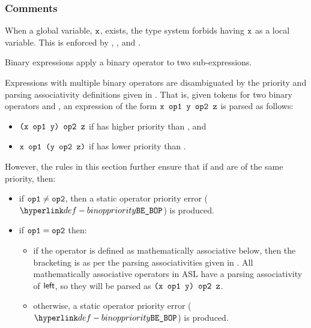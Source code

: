 
\subsubsection{Comments}
When a global variable, $\texttt{x}$, exists, the type system
forbids having $\texttt{x}$ as a local variable.
This is enforced by ,
, and .

\hypertarget{def-binopexpressionterm}{}
Binary expressions apply a binary operator to two sub-expressions.

Expressions with multiple binary operators are disambiguated by the priority
and parsing associativity definitions given in
. That is, given tokens for two binary operators
\opone{} and \optwo{}, an expression of the form
$\texttt{x \texttt{op1}{} y \texttt{op2}{} z}$ is parsed as follows:
\begin{itemize}
  \item $\texttt{(x \texttt{op1}{} y) \texttt{op2}{} z}$ if \opone{} has higher priority than
        \optwo{}, and
  \item $\texttt{x \texttt{op1}{} (y \texttt{op2}{} z)}$ if \opone{} has lower priority than
        \optwo{}.
\end{itemize}

However, the rules in this section further ensure that if \opone{} and \optwo{}
are of the same priority, then:
\begin{itemize}
  \item if $\texttt{op1}{} \neq \texttt{op2}{}$, then a static operator priority error
        ($\BinopPriority$) is produced.
  \item if $\texttt{op1}{} = \texttt{op2}{}$ then:
    \begin{itemize}
      \item if the operator is defined as mathematically associative below,
            then the bracketing is as per the parsing associativities given
            in .
            All mathematically associative operators in ASL have a parsing
            associativity of $\textsf{left}$, so they will be parsed as
            $\texttt{(x \texttt{op1}{} y) \texttt{op2}{} z}$.
      \item otherwise, a static operator priority error ($\BinopPriority$)
           is produced.
    \end{itemize}
\end{itemize}

